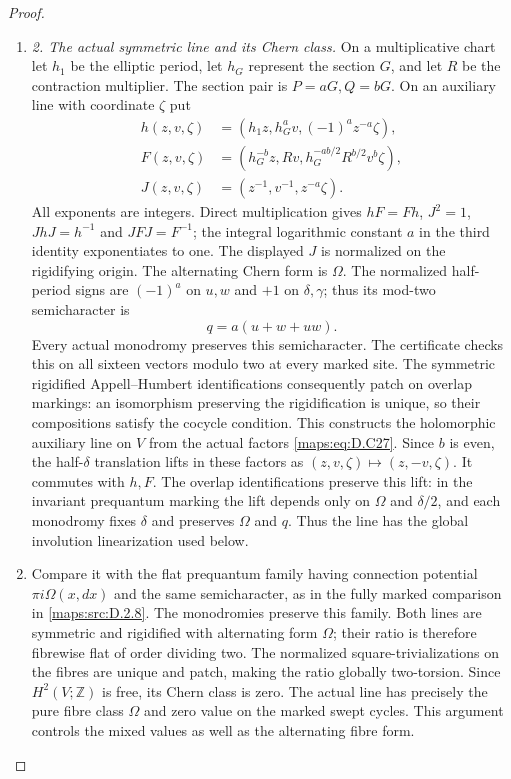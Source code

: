 \begin{proof}
\begin{enumerate}[label=\arabic*.,leftmargin=*]
\item \emph{2. The actual symmetric line and its Chern class.}
On a multiplicative chart let $h_1$ be the elliptic period, let $h_G$
represent the section $G$, and let $R$ be the contraction multiplier.
The section pair is $P=aG,Q=bG$. On an auxiliary line with coordinate
$\zeta$ put
\[
\begin{aligned}
 h(z,v,\zeta)&=(h_1z,h_G^av,(-1)^a z^{-a}\zeta),\\
 F(z,v,\zeta)&=(h_G^{-b}z,Rv,
                 h_G^{-ab/2}R^{b/2}v^b\zeta),\\
 J(z,v,\zeta)&=(z^{-1},v^{-1},z^{-a}\zeta).
\end{aligned}                                                   \tag{D.C27}\label{maps:eq:D.C27}
\]
All exponents are integers. Direct multiplication gives
$hF=Fh$, $J^2=1$, $JhJ=h^{-1}$ and $JFJ=F^{-1}$; the integral
logarithmic constant $a$ in the third identity exponentiates to one.
The displayed $J$ is normalized on the rigidifying origin.
The alternating Chern form is $\Omega$. The normalized half-period
signs are $(-1)^a$ on $u,w$ and $+1$ on $\delta,\gamma$; thus its
mod-two semicharacter is
\[
                    q=a(u+w+uw).                              \tag{D.C28}\label{maps:eq:D.C28}
\]
Every actual monodromy preserves this semicharacter. The certificate
checks this on all sixteen vectors modulo two at every marked site.
The symmetric rigidified Appell--Humbert identifications consequently
patch on overlap markings: an isomorphism preserving the rigidification
is unique, so their compositions satisfy the cocycle condition.
This constructs the holomorphic auxiliary line on $V$ from the actual
factors \eqref{maps:eq:D.C27}.
Since $b$ is even, the half-$\delta$ translation lifts in these factors
as $(z,v,\zeta)\mapsto(z,-v,\zeta)$. It commutes with $h,F$.
The overlap identifications preserve this lift: in the invariant
prequantum marking the lift depends only on $\Omega$ and $\delta/2$,
and each monodromy fixes $\delta$ and preserves $\Omega$ and $q$.
Thus the line has the global involution linearization used below.

\item Compare it with the flat prequantum family having connection potential
$\pi i\Omega(x,dx)$ and the same semicharacter, as in the fully marked
comparison in \ref{maps:src:D.2.8}. The monodromies preserve this family. Both lines
are symmetric and rigidified with alternating form $\Omega$; their
ratio is therefore fibrewise flat of order dividing two. The normalized
square-trivializations on the fibres are unique and patch, making the
ratio globally two-torsion. Since $H^2(V;\mathbb Z)$ is free, its Chern
class is zero. The actual line has precisely the pure fibre class
$\Omega$ and zero value on the marked swept cycles. This argument
controls the mixed values as well as the alternating fibre form.


\end{enumerate}
\end{proof}
